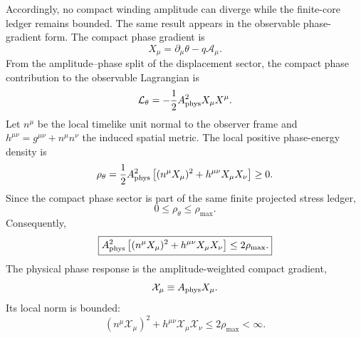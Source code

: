 \documentclass[11pt]{article}
\begin{document}
Accordingly, no compact winding amplitude can diverge while the finite-core
ledger remains bounded. The same result appears in the observable phase-gradient form. The compact
phase gradient is
\begin{equation}
X_\mu
=
\partial_\mu\theta
-
q\mathcal A_\mu .
\end{equation}
From the amplitude--phase split of the displacement sector, the compact phase
contribution to the observable Lagrangian is
\begin{equation}
\mathcal L_\theta
=
-\frac12
A_{\rm phys}^2
X_\mu X^\mu .
\end{equation}
Let \(n^\mu\) be the local timelike unit normal to the observer frame and
\(h^{\mu\nu}=g^{\mu\nu}+n^\mu n^\nu\) the induced spatial metric. The local
positive phase-energy density is
\begin{equation}
\rho_\theta
=
\frac12
A_{\rm phys}^2
\left[
(n^\mu X_\mu)^2
+
h^{\mu\nu}X_\mu X_\nu
\right]
\geq0.
\end{equation}
Since the compact phase sector is part of the same finite projected stress
ledger,
\begin{equation}
0
\leq
\rho_\theta
\leq
\rho_{\max}.
\end{equation}
Consequently,
\begin{equation}
\boxed{
A_{\rm phys}^2
\left[
(n^\mu X_\mu)^2
+
h^{\mu\nu}X_\mu X_\nu
\right]
\leq
2\rho_{\max}.
}
\end{equation}
The physical phase response is the amplitude-weighted compact gradient,
\begin{equation}
\mathcal X_\mu
\equiv
A_{\rm phys}X_\mu .
\end{equation}
Its local norm is bounded:
\begin{equation}
\boxed{
(n^\mu\mathcal X_\mu)^2
+
h^{\mu\nu}\mathcal X_\mu\mathcal X_\nu
\leq
2\rho_{\max}
<
\infty.
}
\end{equation}
\end{document}
